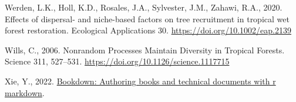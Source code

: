 \documentclass[
  12pt,
]{article}
\newlength{\cslhangindent}
\newlength{\cslentryspacingunit} %
\newenvironment{CSLReferences}[2] %
 {%
  \setlength{\parindent}{0pt}
  \ifodd #1
  \let\oldpar\par
  \def\par{\hangindent=\cslhangindent\oldpar}
  \fi
  \setlength{\parskip}{#2\cslentryspacingunit}
 }%
 {}
\begin{document}
\begin{CSLReferences}{1}{0}
\leavevmode{}%
Werden, L.K., Holl, K.D., Rosales, J.A., Sylvester, J.M., Zahawi, R.A., 2020. Effects of dispersal- and niche-based factors on tree recruitment in tropical wet forest restoration. Ecological Applications 30. \url{https://doi.org/10.1002/eap.2139}

\leavevmode{}%
Wills, C., 2006. Nonrandom {Processes Maintain Diversity} in {Tropical Forests}. Science 311, 527--531. \url{https://doi.org/10.1126/science.1117715}

\leavevmode{}%
Xie, Y., 2022. \href{https://github.com/rstudio/bookdown}{Bookdown: Authoring books and technical documents with r markdown}.

\end{CSLReferences}
\end{document}
